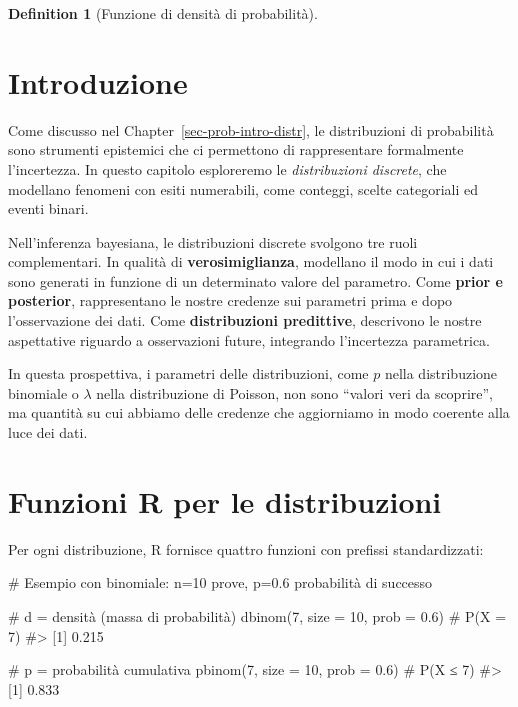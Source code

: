 \documentclass[
  letterpaper,
  DIV=11,
  numbers=noendperiod,
  oneside]{scrreprt}
\newenvironment{Shaded}{\begin{snugshade}}{\end{snugshade}}
\newcommand{\AttributeTok}[1]{\textcolor[rgb]{0.40,0.45,0.13}{#1}}
\newcommand{\CommentTok}[1]{\textcolor[rgb]{0.37,0.37,0.37}{#1}}
\newcommand{\DecValTok}[1]{\textcolor[rgb]{0.68,0.00,0.00}{#1}}
\newcommand{\FloatTok}[1]{\textcolor[rgb]{0.68,0.00,0.00}{#1}}
\newcommand{\FunctionTok}[1]{\textcolor[rgb]{0.28,0.35,0.67}{#1}}
\newcommand{\NormalTok}[1]{\textcolor[rgb]{0.00,0.23,0.31}{#1}}
\theoremstyle{definition}
\theoremstyle{plain}
\theoremstyle{definition}
\newtheorem{definition}{Definition}[chapter]
\theoremstyle{remark}
\begin{document}
\begin{definition}[Funzione di densità di
probabilità]
\begin{tcolorbox}
\end{tcolorbox}

\section*{Introduzione}\label{introduzione-11}


Come discusso nel Chapter~\ref{sec-prob-intro-distr}, le distribuzioni
di probabilità sono strumenti epistemici che ci permettono di
rappresentare formalmente l'incertezza. In questo capitolo esploreremo
le \emph{distribuzioni discrete}, che modellano fenomeni con esiti
numerabili, come conteggi, scelte categoriali ed eventi binari.

Nell'inferenza bayesiana, le distribuzioni discrete svolgono tre ruoli
complementari. In qualità di \textbf{verosimiglianza}, modellano il modo
in cui i dati sono generati in funzione di un determinato valore del
parametro. Come \textbf{prior e posterior}, rappresentano le nostre
credenze sui parametri prima e dopo l'osservazione dei dati. Come
\textbf{distribuzioni predittive}, descrivono le nostre aspettative
riguardo a osservazioni future, integrando l'incertezza parametrica.

In questa prospettiva, i parametri delle distribuzioni, come \(p\) nella
distribuzione binomiale o \(\lambda\) nella distribuzione di Poisson,
non sono ``valori veri da scoprire'', ma quantità su cui abbiamo delle
credenze che aggiorniamo in modo coerente alla luce dei dati.

\section{Funzioni R per le
distribuzioni}\label{funzioni-r-per-le-distribuzioni}

Per ogni distribuzione, R fornisce quattro funzioni con prefissi
standardizzati:

\begin{Shaded}
\begin{Highlighting}[]
\CommentTok{\# Esempio con binomiale: n=10 prove, p=0.6 probabilità di successo}

\CommentTok{\# d = densità (massa di probabilità)}
\FunctionTok{dbinom}\NormalTok{(}\DecValTok{7}\NormalTok{, }\AttributeTok{size =} \DecValTok{10}\NormalTok{, }\AttributeTok{prob =} \FloatTok{0.6}\NormalTok{)  }\CommentTok{\# P(X = 7)}
\CommentTok{\#\textgreater{} [1] 0.215}

\CommentTok{\# p = probabilità cumulativa  }
\FunctionTok{pbinom}\NormalTok{(}\DecValTok{7}\NormalTok{, }\AttributeTok{size =} \DecValTok{10}\NormalTok{, }\AttributeTok{prob =} \FloatTok{0.6}\NormalTok{)  }\CommentTok{\# P(X ≤ 7)}
\CommentTok{\#\textgreater{} [1] 0.833}


\end{Highlighting}
\end{Shaded}
\end{definition}
\end{document}

